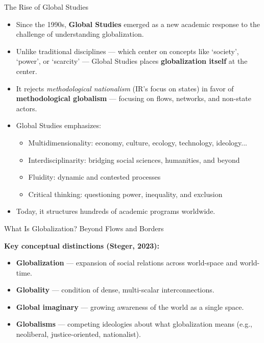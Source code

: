 \documentclass{beamer}
\begin{document}
\begin{frame}{The Rise of Global Studies}

\small
\begin{itemize}
    \item Since the 1990s, \textbf{Global Studies} emerged as a new academic response to the challenge of understanding globalization.

    \item Unlike traditional disciplines — which center on concepts like ‘society’, ‘power’, or ‘scarcity’ — Global Studies places \textbf{globalization itself} at the center.

    \item It rejects \textit{methodological nationalism} (IR’s focus on states) in favor of \textbf{methodological globalism} — focusing on flows, networks, and non-state actors.

    \item Global Studies emphasizes:
    \begin{itemize}
        \item Multidimensionality: economy, culture, ecology, technology, ideology...
        \item Interdisciplinarity: bridging social sciences, humanities, and beyond
        \item Fluidity: dynamic and contested processes
        \item Critical thinking: questioning power, inequality, and exclusion
    \end{itemize}

    \item Today, it structures hundreds of academic programs worldwide.
\end{itemize}
\end{frame}

\begin{frame}{What Is Globalization? Beyond Flows and Borders}

\small


\textbf{Key conceptual distinctions (Steger, 2023):}
\begin{itemize}
    \item \textbf{Globalization} — expansion of social relations across world-space and world-time.
    \item \textbf{Globality} — condition of dense, multi-scalar interconnections.
    \item \textbf{Global imaginary} — growing awareness of the world as a single space.
    \item \textbf{Globalisms} — competing ideologies about what globalization means (e.g., neoliberal, justice-oriented, nationalist).
\end{itemize}

\end{frame}
\end{document}
